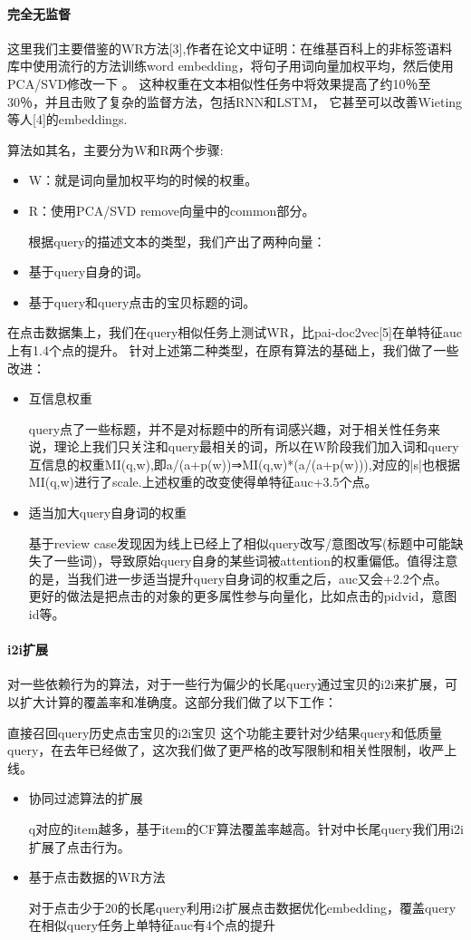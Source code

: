 \paragraph{完全无监督}
这里我们主要借鉴的WR方法[3],作者在论文中证明：在维基百科上的非标签语料库中使用流行的方法训练word embedding，将句子用词向量加权平均，然后使用PCA/SVD修改一下 。 这种权重在文本相似性任务中将效果提高了约10％至30％，并且击败了复杂的监督方法，包括RNN和LSTM， 它甚至可以改善Wieting等人[4]的embeddings.

算法如其名，主要分为W和R两个步骤:
\begin{itemize}
\item W：就是词向量加权平均的时候的权重。
\item R：使用PCA/SVD remove向量中的common部分。
\end{itemize}    
根据query的描述文本的类型，我们产出了两种向量：
\begin{itemize}
\item 基于query自身的词。
\item 基于query和query点击的宝贝标题的词。
\end{itemize}

在点击数据集上，我们在query相似任务上测试WR，比pai-doc2vec[5]在单特征auc上有1.4个点的提升。
针对上述第二种类型，在原有算法的基础上，我们做了一些改进：
\begin{itemize}
\item 互信息权重
\par query点了一些标题，并不是对标题中的所有词感兴趣，对于相关性任务来说，理论上我们只关注和query最相关的词，所以在W阶段我们加入词和query互信息的权重MI(q,w),即a/(a+p(w))⇒MI(q,w)*(a/(a+p(w))),对应的|s|也根据MI(q,w)进行了scale.上述权重的改变使得单特征auc+3.5个点。
\item 适当加大query自身词的权重
\par 基于review case发现因为线上已经上了相似query改写/意图改写(标题中可能缺失了一些词)，导致原始query自身的某些词被attention的权重偏低。值得注意的是，当我们进一步适当提升query自身词的权重之后，auc又会+2.2个点。
更好的做法是把点击的对象的更多属性参与向量化，比如点击的pidvid，意图id等。
\end{itemize}

\paragraph{i2i扩展}
对一些依赖行为的算法，对于一些行为偏少的长尾query通过宝贝的i2i来扩展，可以扩大计算的覆盖率和准确度。这部分我们做了以下工作：

直接召回query历史点击宝贝的i2i宝贝
这个功能主要针对少结果query和低质量query，在去年已经做了，这次我们做了更严格的改写限制和相关性限制，收严上线。
\begin{itemize}
\item 协同过滤算法的扩展
\par q对应的item越多，基于item的CF算法覆盖率越高。针对中长尾query我们用i2i扩展了点击行为。
\item 基于点击数据的WR方法
\par 对于点击少于20的长尾query利用i2i扩展点击数据优化embedding，覆盖query在相似query任务上单特征auc有4个点的提升
\end{itemize}
